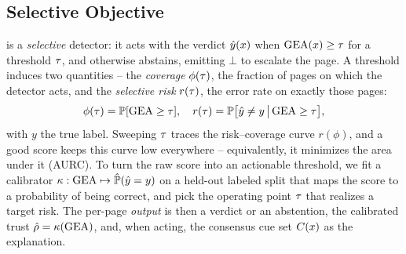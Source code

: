 \subsection{Selective Objective}
\label{sec:form-objective}
\toolname{} is a \emph{selective} detector: it acts with the verdict $\hat y(x)$
when $\mathrm{GEA}(x)\ge\tau$ for a threshold $\tau$, and otherwise abstains, emitting
$\bot$ to escalate the page. A threshold induces two quantities -- the \emph{coverage}
$\phi(\tau)$, the fraction of pages on which the detector acts, and the \emph{selective
risk} $r(\tau)$, the error rate on exactly those pages:
\begin{equation}
\phi(\tau)=\mathbb{P}[\mathrm{GEA}\ge\tau],\quad
r(\tau)=\mathbb{P}\bigl[\hat y\neq y \,\big|\, \mathrm{GEA}\ge\tau\bigr],
\label{eq:objective}
\end{equation}
with $y$ the true label. Sweeping $\tau$ traces the risk--coverage curve $r(\phi)$,
and a good score keeps this curve low everywhere -- equivalently, it minimizes the area
under it (AURC). To turn the raw score into an actionable threshold, we fit a
calibrator $\kappa:\mathrm{GEA}\mapsto\hat{\mathbb{P}}(\hat y=y)$ on a held-out labeled split
that maps the score to a probability of being correct, and pick the operating point
$\tau$ that realizes a target risk. The per-page \emph{output} is then a verdict or an
abstention, the calibrated trust $\hat\rho=\kappa(\mathrm{GEA})$, and, when acting, the
consensus cue set $C(x)$ as the explanation.

